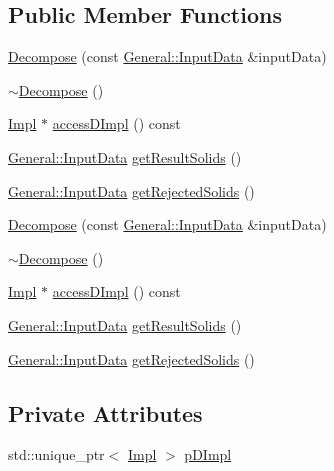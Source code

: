 \subsection*{Public Member Functions}
\begin{DoxyCompactItemize}
\item 
\hyperlink{classMcCAD_1_1Decomposition_1_1Decompose_af2f1861cb1e63cc0523ef59a73f996f4}{Decompose} (const \hyperlink{classMcCAD_1_1General_1_1InputData}{General\+::\+Input\+Data} \&input\+Data)
\item 
\hyperlink{classMcCAD_1_1Decomposition_1_1Decompose_a044e46752ce3802e9484a58b82829162}{$\sim$\+Decompose} ()
\item 
\hyperlink{classMcCAD_1_1Decomposition_1_1Decompose_1_1Impl}{Impl} $\ast$ \hyperlink{classMcCAD_1_1Decomposition_1_1Decompose_a45796aa043ed86a9c22fbc3028ef9bbe}{access\+D\+Impl} () const
\item 
\hyperlink{classMcCAD_1_1General_1_1InputData}{General\+::\+Input\+Data} \hyperlink{classMcCAD_1_1Decomposition_1_1Decompose_a5db8eec150047c16365cf090d2ec0cdf}{get\+Result\+Solids} ()
\item 
\hyperlink{classMcCAD_1_1General_1_1InputData}{General\+::\+Input\+Data} \hyperlink{classMcCAD_1_1Decomposition_1_1Decompose_a92b11ca5c26619903eefce5e19929f7d}{get\+Rejected\+Solids} ()
\item 
\hyperlink{classMcCAD_1_1Decomposition_1_1Decompose_af2f1861cb1e63cc0523ef59a73f996f4}{Decompose} (const \hyperlink{classMcCAD_1_1General_1_1InputData}{General\+::\+Input\+Data} \&input\+Data)
\item 
\hyperlink{classMcCAD_1_1Decomposition_1_1Decompose_a044e46752ce3802e9484a58b82829162}{$\sim$\+Decompose} ()
\item 
\hyperlink{classMcCAD_1_1Decomposition_1_1Decompose_1_1Impl}{Impl} $\ast$ \hyperlink{classMcCAD_1_1Decomposition_1_1Decompose_a3ea80c57708a014f34aec5fdf7c97805}{access\+D\+Impl} () const
\item 
\hyperlink{classMcCAD_1_1General_1_1InputData}{General\+::\+Input\+Data} \hyperlink{classMcCAD_1_1Decomposition_1_1Decompose_a6da380718a3f2b83a99a949f63ab60c0}{get\+Result\+Solids} ()
\item 
\hyperlink{classMcCAD_1_1General_1_1InputData}{General\+::\+Input\+Data} \hyperlink{classMcCAD_1_1Decomposition_1_1Decompose_a3c717a72f3cc1a30f316cde4d9ec1f4b}{get\+Rejected\+Solids} ()
\end{DoxyCompactItemize}
\subsection*{Private Attributes}
\begin{DoxyCompactItemize}
\item 
std\+::unique\+\_\+ptr$<$ \hyperlink{classMcCAD_1_1Decomposition_1_1Decompose_1_1Impl}{Impl} $>$ \hyperlink{classMcCAD_1_1Decomposition_1_1Decompose_aa39ced95c033a2a77e4fe2c60ad8427c}{p\+D\+Impl}
\end{DoxyCompactItemize}


